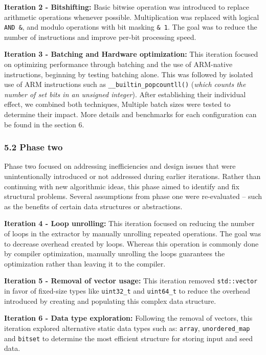 \documentclass{sigchi}
\begin{document}
\textbf{Iteration 2 - Bitshifting:} Basic bitwise operation was introduced to replace arithmetic operations whenever possible. Multiplication was replaced with logical \texttt{AND\ \&}, and modulo operations with bit masking \texttt{\&\ 1}. The goal was to reduce the number of instructions and improve per-bit processing speed.

\textbf{Iteration 3 - Batching and Hardware optimization:} This iteration focused on optimizing performance through batching and the use of ARM-native instructions, beginning by testing batching alone. This was followed by isolated use of ARM instructions such as \texttt{\_\_builtin\_popcountll()} (\emph{which counts the number of set bits in an unsigned integer}). After establishing their individual effect, we combined both techniques, Multiple batch sizes were tested to determine their impact. More details and benchmarks for each configuration can be found in the section 6.

\subsubsection{5.2 Phase two}\label{phase-two}

Phase two focused on addressing inefficiencies and design issues that were unintentionally introduced or not addressed during earlier iterations. Rather than continuing with new algorithmic ideas, this phase aimed to identify and fix structural problems. Several assumptions from phase one were re-evaluated -- such as the benefits of certain data structures or abstractions.

\textbf{Iteration 4 - Loop unrolling:} This iteration focused on reducing the number of loops in the extractor by manually unrolling repeated operations. The goal was to decrease overhead created by loops. Whereas this operation is commonly done by compiler optimization, manually unrolling the loops guarantees the optimization rather than leaving it to the compiler.

\textbf{Iteration 5 - Removal of vector usage:} This iteration removed \texttt{std::vector} in favor of fixed-size types like \texttt{uint32\_t} and \texttt{uint64\_t} to reduce the overhead introduced by creating and populating this complex data structure.

\textbf{Iteration 6 - Data type exploration:} Following the removal of vectors, this iteration explored alternative static data types such as: \texttt{array}, \texttt{unordered\_map} and \texttt{bitset} to determine the most efficient structure for storing input and seed data.
\end{document}
